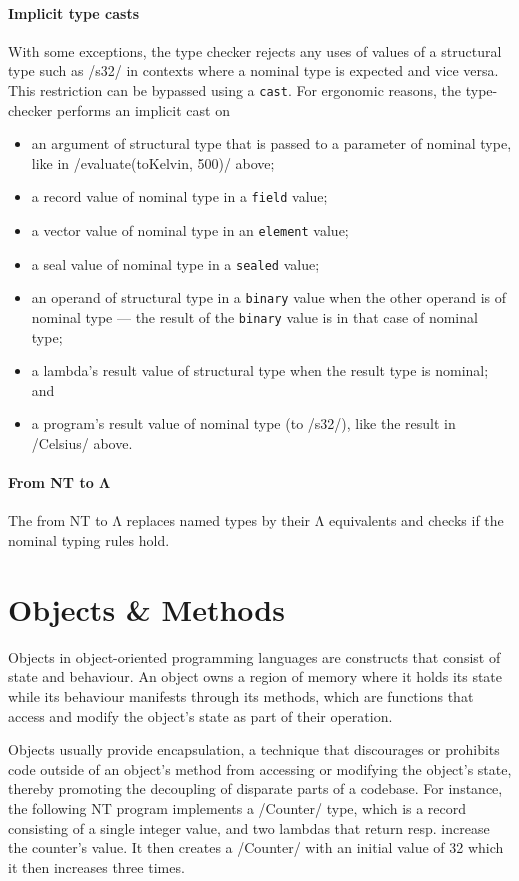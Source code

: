 \documentclass[main.tex]{subfiles}
\begin{document}
\paragraph{Implicit type casts} With some exceptions, the type checker rejects any uses of values of a structural type such as \iil/s32/ in contexts where a nominal type is expected and vice versa. This restriction can be bypassed using a \texttt{cast}. For ergonomic reasons, the type-checker performs an implicit cast on
\begin{itemize}[nosep]
	\item an argument of structural type that is passed to a parameter of nominal type, like in \iil/evaluate(toKelvin, 500)/ above;
	\item a record value of nominal type in a \texttt{field} value;
	\item a vector value of nominal type in an \texttt{element} value;
	\item a seal value of nominal type in a \texttt{sealed} value;
	\item an operand of structural type in a \texttt{binary} value when the other operand is of nominal type — the result of the \texttt{binary} value is in that case of nominal type;
	\item a lambda's result value of structural type when the result type is nominal; and
	\item a program's result value of nominal type (to \iil/s32/), like the result in \iil/Celsius/ above.
\end{itemize}

\paragraph{From NT to Λ} The  from NT to Λ replaces named types by their Λ equivalents and checks if the nominal typing rules hold.

\section{Objects \& Methods} \label{sct:obj-meth}
Objects in object-oriented programming languages are constructs that consist of state and behaviour. An object owns a region of memory where it holds its state while its behaviour manifests through its methods, which are functions that access and modify the object's state as part of their operation.

Objects usually provide encapsulation, a technique that discourages or prohibits code outside of an object's method from accessing or modifying the object's state, thereby promoting the decoupling of disparate parts of a codebase. For instance, the following NT program implements a \iil/Counter/ type, which is a record consisting of a single integer value, and two lambdas that return resp. increase the counter's value. It then creates a \iil/Counter/ with an initial value of 32 which it then increases three times.
\end{document}
